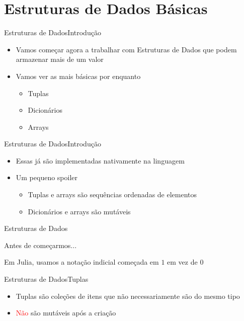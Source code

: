\documentclass{beamer}
\begin{document}
\section{Estruturas de Dados Básicas}
\begin{frame}{Estruturas de Dados}{Introdução}
    \begin{itemize}
        \item Vamos começar agora a trabalhar com Estruturas de Dados que podem armazenar mais de um valor
        \item Vamos ver as mais básicas por enquanto
        \begin{itemize}
            \item Tuplas
            \item Dicionários
            \item Arrays
        \end{itemize}
        
    \end{itemize}
\end{frame}

\begin{frame}{Estruturas de Dados}{Introdução}
    \begin{itemize}
        \item Essas já são implementadas nativamente na linguagem
        \item Um pequeno spoiler
        \begin{itemize}
            \item Tuplas e arrays são sequências ordenadas de elementos
            \item Dicionários e arrays são mutáveis
        \end{itemize}
        
    \end{itemize}
\end{frame}

\begin{frame}{Estruturas de Dados}{}
    \begin{block}{Antes de começarmos...}
        \begin{center}
            Em Julia, usamos a notação indicial começada em $1$ em vez de $0$
        \end{center}
    \end{block}
\end{frame}

\begin{frame}{Estruturas de Dados}{Tuplas}
    \begin{itemize}
        \item Tuplas são coleções de itens que não necessariamente são do mesmo tipo
        \item \textcolor{red}{Não} são mutáveis após a criação
    \end{itemize}
\end{frame}
\end{document}
